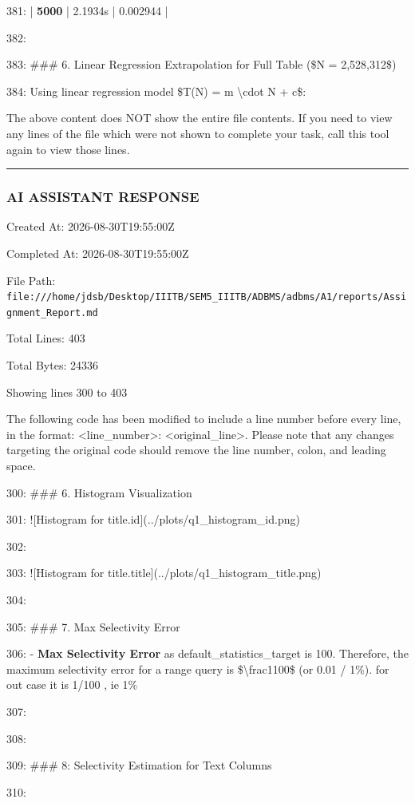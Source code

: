 \documentclass[11pt,a4paper]{article}
\begin{document}
{381: | \textbf{5000} | 2.1934s | 0.002944 |

382:

383: \#\#\# 6. Linear Regression Extrapolation for Full Table (\$N = 2,528,312\$)

384: Using linear regression model \$T(N) = m \textbackslash{}cdot N + c\$:

The above content does NOT show the entire file contents. If you need to view any lines of the file which were not shown to complete your task, call this tool again to view those lines.


\hrule

\subsubsection{AI ASSISTANT RESPONSE}

Created At: 2026-08-30T19:55:00Z

Completed At: 2026-08-30T19:55:00Z

File Path: \texttt{file:///home/jdsb/Desktop/IIITB/SEM5\_IIITB/ADBMS/adbms/A1/reports/Assignment\_Report.md}

Total Lines: 403

Total Bytes: 24336

Showing lines 300 to 403

The following code has been modified to include a line number before every line, in the format: <line\_number>: <original\_line>. Please note that any changes targeting the original code should remove the line number, colon, and leading space.

300: \#\#\# 6. Histogram Visualization

301: ![Histogram for title.id](../plots/q1\_histogram\_id.png)

302:

303: ![Histogram for title.title](../plots/q1\_histogram\_title.png)

304:

305: \#\#\# 7. Max Selectivity Error

306: - \textbf{Max Selectivity Error} as default\_statistics\_target is 100. Therefore, the maximum selectivity error for a range query is \$\textbackslash{}frac{1}{100}\$ (or 0.01 / 1\%). for out case it is 1/100 , ie 1\%

307:

308:

309: \#\#\# 8: Selectivity Estimation for Text Columns

310:

}
\end{document}
